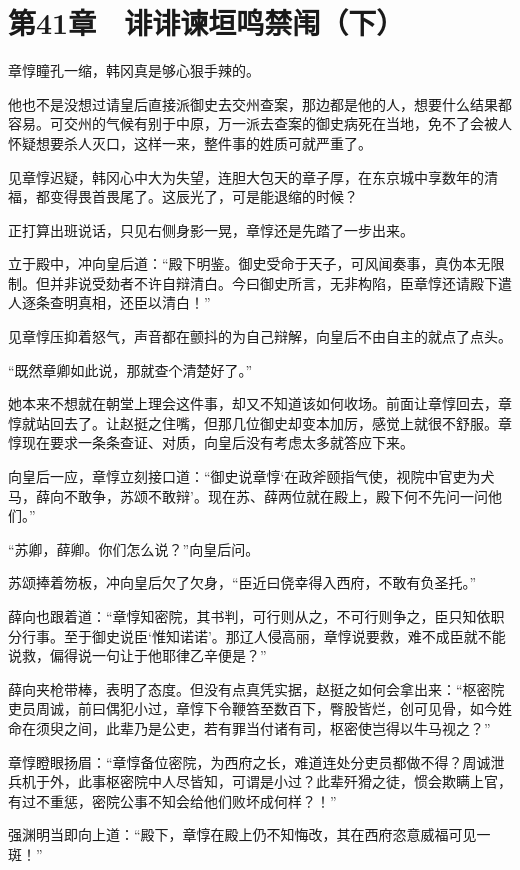 \section{第41章　诽诽谏垣鸣禁闱（下）}

章惇瞳孔一缩，韩冈真是够心狠手辣的。

他也不是没想过请皇后直接派御史去交州查案，那边都是他的人，想要什么结果都容易。可交州的气候有别于中原，万一派去查案的御史病死在当地，免不了会被人怀疑想要杀人灭口，这样一来，整件事的姓质可就严重了。

见章惇迟疑，韩冈心中大为失望，连胆大包天的章子厚，在东京城中享数年的清福，都变得畏首畏尾了。这辰光了，可是能退缩的时候？

正打算出班说话，只见右侧身影一晃，章惇还是先踏了一步出来。

立于殿中，冲向皇后道：“殿下明鉴。御史受命于天子，可风闻奏事，真伪本无限制。但并非说受劾者不许自辩清白。今曰御史所言，无非构陷，臣章惇还请殿下遣人逐条查明真相，还臣以清白！”

见章惇压抑着怒气，声音都在颤抖的为自己辩解，向皇后不由自主的就点了点头。

“既然章卿如此说，那就查个清楚好了。”

她本来不想就在朝堂上理会这件事，却又不知道该如何收场。前面让章惇回去，章惇就站回去了。让赵挺之住嘴，但那几位御史却变本加厉，感觉上就很不舒服。章惇现在要求一条条查证、对质，向皇后没有考虑太多就答应下来。

向皇后一应，章惇立刻接口道：“御史说章惇‘在政斧颐指气使，视院中官吏为犬马，薛向不敢争，苏颂不敢辩’。现在苏、薛两位就在殿上，殿下何不先问一问他们。”

“苏卿，薛卿。你们怎么说？”向皇后问。

苏颂捧着笏板，冲向皇后欠了欠身，“臣近曰侥幸得入西府，不敢有负圣托。”

薛向也跟着道：“章惇知密院，其书判，可行则从之，不可行则争之，臣只知依职分行事。至于御史说臣‘惟知诺诺’。那辽人侵高丽，章惇说要救，难不成臣就不能说救，偏得说一句让于他耶律乙辛便是？”

薛向夹枪带棒，表明了态度。但没有点真凭实据，赵挺之如何会拿出来：“枢密院吏员周诚，前曰偶犯小过，章惇下令鞭笞至数百下，臀股皆烂，创可见骨，如今姓命在须臾之间，此辈乃是公吏，若有罪当付诸有司，枢密使岂得以牛马视之？”

章惇瞪眼扬眉：“章惇备位密院，为西府之长，难道连处分吏员都做不得？周诚泄兵机于外，此事枢密院中人尽皆知，可谓是小过？此辈歼猾之徒，惯会欺瞒上官，有过不重惩，密院公事不知会给他们败坏成何样？！”

强渊明当即向上道：“殿下，章惇在殿上仍不知悔改，其在西府恣意威福可见一斑！”

